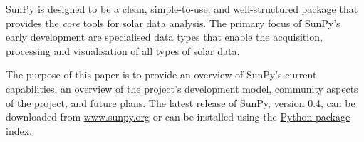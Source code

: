 SunPy is designed to be a clean, simple-to-use, and well-structured 
package that provides the \textit{core} tools for solar data analysis. 
The primary focus of SunPy's early development are 
specialised data types that enable the acquisition, processing and 
visualisation of all types of solar data.

The purpose of this paper is to provide an overview of SunPy's current 
capabilities, an overview of the project's development model, community aspects of the 
project, and future plans. The latest release of SunPy, version 0.4,
can be downloaded from \href{http://sunpy.org}{www.sunpy.org} or can be
installed using the \href{http://pypi.python.org/pypi}{Python package index}.
